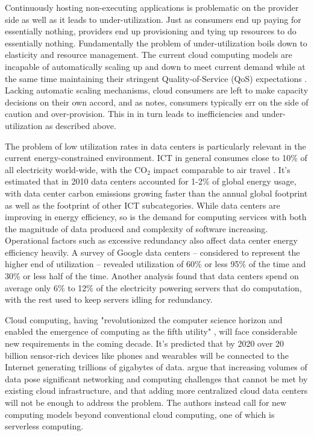 \documentclass[utf8,english]{gradu3}
\begin{document}
Continuously hosting non-executing applications is problematic on the provider side as well as it leads to under-utilization. Just as consumers end up paying for essentially nothing, providers end up provisioning and tying up resources to do essentially nothing. Fundamentally the problem of under-utilization boils down to elasticity and resource management. The current cloud computing models are incapable of automatically scaling up and down to meet current demand while at the same time maintaining their stringent Quality-of-Service (QoS) expectations \parencite{buyya2017manifesto}. Lacking automatic scaling mechanisms, cloud consumers are left to make capacity decisions on their own accord, and as \textcite{robert2016serverlessarchitectures} notes, consumers typically err on the side of caution and over-provision. This in in turn leads to inefficiencies and under-utilization as described above.

The problem of low utilization rates in data centers is particularly relevant in the current energy-constrained environment. ICT in general consumes close to 10\% of all electricity world-wide, with the CO$_2$ impact comparable to air travel \parencite{buyya2017manifesto}. It's estimated that in 2010 data centers accounted for 1-2\% of global energy usage, with data center carbon emissions growing faster than the annual global footprint as well as the footprint of other ICT subcategories. While data centers are improving in energy efficiency, so is the demand for computing services with both the magnitude of data produced and complexity of software increasing. Operational factors such as excessive redundancy also affect data center energy efficiency heavily. A survey of Google data centers -- considered to represent the higher end of utilization -- revealed utilization of 60\% or less 95\% of the time and 30\% or less half of the time. Another analysis found that data centers spend on average only 6\% to 12\% of the electricity powering servers that do computation, with the rest used to keep servers idling for redundancy. \parencite{horner16powerusage}

Cloud computing, having "revolutionized the computer science horizon and enabled the emergence of computing as the fifth utility" \parencite{buyya2017manifesto}, will face considerable new requirements in the coming decade. It's predicted that by 2020 over 20 billion sensor-rich devices like phones and wearables will be connected to the Internet generating trillions of gigabytes of data. \textcite{varghese18next} argue that increasing volumes of data pose significant networking and computing challenges that cannot be met by existing cloud infrastructure, and that adding more centralized cloud data centers will not be enough to address the problem. The authors instead call for new computing models beyond conventional cloud computing, one of which is serverless computing.
\end{document}
